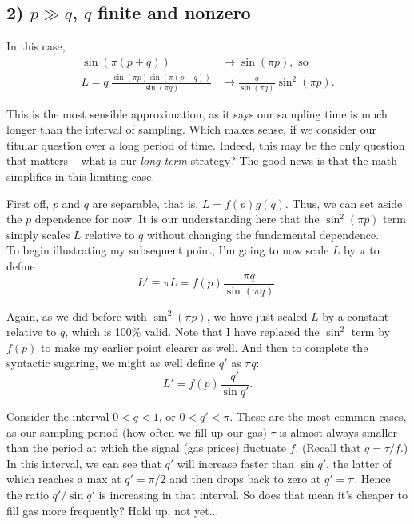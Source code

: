 \documentclass[11pt]{article}
\begin{document}
\subsection*{2) $p \gg q$, $q$ finite and nonzero}

 In this case,
\begin{align}
\sin (\pi(p+q))  &\rightarrow \sin(\pi p), \text{ so} \nonumber\\[0.5em]
L = q \: \frac{\sin(\pi p) \sin(\pi (p+q))}{\sin(\pi q)} &\rightarrow \frac{q}{\sin(\pi q)}\sin^2(\pi p). \label{eq:p_to_infty}
\end{align}

This is the most sensible approximation, as it says our sampling time is much longer than the interval of sampling. Which makes sense, if we consider our titular question over a long period of time. Indeed, this may be the only question that matters -- what is our \textit{long-term} strategy? The good news is that the math simplifies in this limiting case. \\

\par
First off, $p$ and $q$ are separable, that is, $L = f(p)g(q)$. Thus, we can set aside the $p$ dependence for now. It is our understanding here that the $\sin^2(\pi p)$ term simply scales $L$ relative to $q$ without changing the fundamental dependence. \\

To begin illustrating my subsequent point, I'm going to now scale $L$ by $\pi$ to define
\begin{equation}
L' \equiv \pi L = f(p) \frac{\pi q}{\sin (\pi q)}.
\end{equation}

Again, as we did before with $\sin^2(\pi p)$, we have just scaled $L$ by a constant relative to $q$, which is 100\% valid. Note that I have replaced the $\sin^2$ term by $f(p)$ to make my earlier point clearer as well. And then to complete the syntactic sugaring, we might as well define $q'$ as $\pi q$:
\begin{equation}
L' = f(p) \frac{q'}{\sin q'}. \label{eq:L_scaled_q_prime}
\end{equation}

Consider the interval $0 < q < 1$, or $0 < q' < \pi$. These are the most common cases, as our sampling period (how often we fill up our gas) $\tau$ is almost always smaller than the period at which the signal (gas prices) fluctuate $f$. (Recall that $q = \tau / f$.) In this interval, we can see that $q'$ will increase faster than $\sin q'$, the latter of which reaches a max at $q' =\pi/2$ and then drops back to zero at $q' = \pi$. Hence the ratio $q'/\sin q'$ is increasing in that interval. So does that mean it's cheaper to fill gas more frequently? Hold up, not yet...
\end{document}
